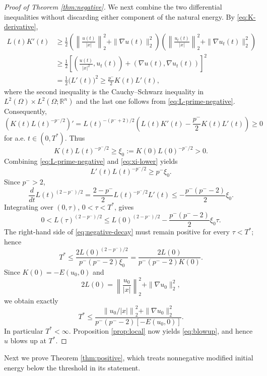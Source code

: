 \documentclass[12pt,reqno]{amsart}
\theoremstyle{definition}
\theoremstyle{remark}
\numberwithin{equation}{section}
\begin{document}
\begin{proof}[Proof of Theorem \ref{thm:negative}]
	We next combine the two differential inequalities without discarding either component of the natural energy. By \eqref{eq:K-derivative},
	\begin{align*}
	L(t)K'(t)
	&\ge \frac12\left(
	\left\|\frac{u(t)}{|x|}\right\|_2^2+\|\nabla u(t)\|_2^2
	\right)
	\left(
	\left\|\frac{u_t(t)}{|x|}\right\|_2^2+\|\nabla u_t(t)\|_2^2
	\right)\\
	&\ge \frac12\left[
	\left(\frac{u(t)}{|x|^2},u_t(t)\right)
	+(\nabla u(t),\nabla u_t(t))
	\right]^2\\
	&=\frac12\big(L'(t)\big)^2
	\ge \frac{p^-}{2}K(t)L'(t),
	\end{align*}
	where the second inequality is the Cauchy--Schwarz inequality in
	$L^2(\Omega)\times L^2(\Omega;\mathbb{R}^n)$ and the last one follows from \eqref{eq:L-prime-negative}.
	Consequently,
	\[
	\left(K(t)L(t)^{-p^-/2}\right)'
	=L(t)^{-(p^-+2)/2}
	\left(L(t)K'(t)-\frac{p^-}{2}K(t)L'(t)\right)\ge0
	\]
	for a.e. $t\in(0,T^*)$.
	Thus
	\begin{equation}\label{eq:xi-lower}
	K(t)L(t)^{-p^-/2}\ge \xi_0
	:=K(0)L(0)^{-p^-/2}>0.
	\end{equation}
	Combining \eqref{eq:L-prime-negative} and \eqref{eq:xi-lower} yields
	\[
	L'(t)L(t)^{-p^-/2}\ge p^-\xi_0.
	\]
	Since $p^->2$,
	\[
	\frac{d}{dt}L(t)^{(2-p^-)/2}
	=\frac{2-p^-}{2}L(t)^{-p^-/2}L'(t)
	\le -\frac{p^-(p^- -2)}{2}\xi_0.
	\]
	Integrating over $(0,\tau)$, $0<\tau<T^*$, gives
	\begin{equation}\label{eq:negative-decay}
	0<L(\tau)^{(2-p^-)/2}
	\le L(0)^{(2-p^-)/2}
	-\frac{p^-(p^- -2)}{2}\xi_0\tau.
	\end{equation}
	The right-hand side of \eqref{eq:negative-decay} must remain positive for every $\tau<T^*$; hence
	\[
	T^*\le
	\frac{2L(0)^{(2-p^-)/2}}{p^-(p^- -2)\xi_0}
	=\frac{2L(0)}{p^-(p^- -2)K(0)}.
	\]
	Since $K(0)=-E(u_0,0)$ and
	\[
	2L(0)=\left\|\frac{u_0}{|x|}\right\|_2^2+\|\nabla u_0\|_2^2,
	\]
	we obtain exactly
	\[
	T^*\le
	\frac{\left\|u_0/|x|\right\|_2^2+\|\nabla u_0\|_2^2}
	{p^-(p^- -2)[-E(u_0,0)]}.
	\]
	In particular $T^*<\infty$. Proposition \ref{prop:local} now yields \eqref{eq:blowup}, and hence $u$ blows up at $T^*$.
\end{proof}



Next we prove Theorem \ref{thm:positive}, which treats nonnegative modified initial energy below the threshold in its statement.
\end{document}
